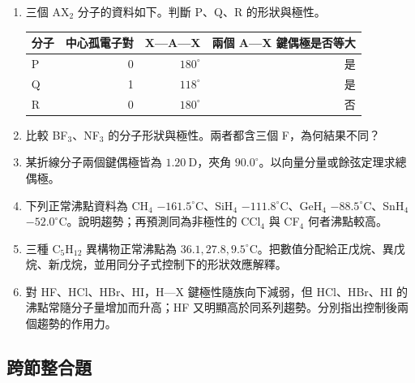 \documentclass[11pt,a4paper]{article}
\newcounter{none}
\begin{document}
\begin{enumerate}
\def\labelenumi{\arabic{enumi}.}
\setcounter{enumi}{6}
\item
  三個 AX\(_2\) 分子的資料如下。判斷 P、Q、R 的形狀與極性。

  {\def\LTcaptype{none} %
  \begin{longtable}[]{@{}lrrr@{}}
  \toprule\noalign{}
  分子 & 中心孤電子對 & X---A---X & 兩個 A---X 鍵偶極是否等大 \\
  \midrule\noalign{}
  \endhead
  \bottomrule\noalign{}
  \endlastfoot
  P & 0 & \(180^\circ\) & 是 \\
  Q & 1 & \(118^\circ\) & 是 \\
  R & 0 & \(180^\circ\) & 否 \\
  \end{longtable}
  }
\item
  比較 BF\(_3\)、NF\(_3\) 的分子形狀與極性。兩者都含三個 F，為何結果不同？
\item
  某折線分子兩個鍵偶極皆為 \(1.20\ \mathrm D\)，夾角 \(90.0^\circ\)。以向量分量或餘弦定理求總偶極。
\item
  下列正常沸點資料為 CH\(_4\) \(-161.5^\circ\mathrm C\)、SiH\(_4\) \(-111.8^\circ\mathrm C\)、GeH\(_4\) \(-88.5^\circ\mathrm C\)、SnH\(_4\) \(-52.0^\circ\mathrm C\)。說明趨勢；再預測同為非極性的 CCl\(_4\) 與 CF\(_4\) 何者沸點較高。
\item
  三種 C\(_5\)H\(_{12}\) 異構物正常沸點為 \(36.1,27.8,9.5^\circ\mathrm C\)。把數值分配給正戊烷、異戊烷、新戊烷，並用同分子式控制下的形狀效應解釋。
\item
  對 HF、HCl、HBr、HI，H---X 鍵極性隨族向下減弱，但 HCl、HBr、HI 的沸點常隨分子量增加而升高；HF 又明顯高於同系列趨勢。分別指出控制後兩個趨勢的作用力。
\end{enumerate}

\subsection{跨節整合題}\label{ux8de8ux7bc0ux6574ux5408ux984c}
\end{document}
